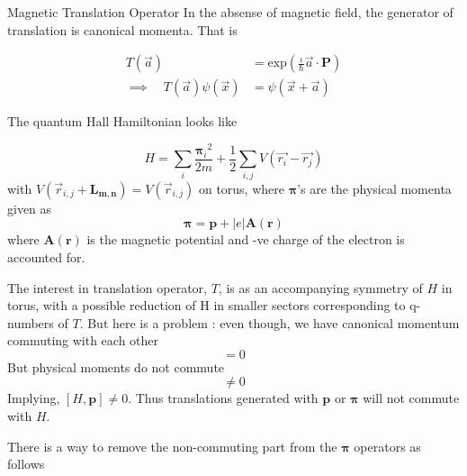\documentclass{beamer}
\newcommand{\bsym}{\boldsymbol}
\newcommand{\non}{\nonumber}
\begin{document}

	\begin{frame}[allowframebreaks]{Magnetic Translation Operator}
  		In the absense of magnetic field, the generator of translation is canonical momenta. That is

  		\begin{align}
    			T(\vec{a}) &= \text{exp}\left( \frac{\iota}{\hbar}{\vec{a}\cdot\bsym{P}}\right) \\
    			\implies \quad T(\vec{a})\psi(\vec{x}) &= \psi(\vec{x}+\vec{a}) \non
  		\end{align}
  
  		\framebreak %
  			  
  		The quantum Hall Hamiltonian looks like 

		\begin{equation}
			H = \sum_{i}\frac{{\bsym{\pi}_{i}}^{2}}{2m}  + \frac{1}{2}\sum_{i,j} V(\vec{r_i}-\vec{r_j})
		\end{equation}
		with $V(\vec{r}_{i,j} + \boldsymbol{L_{m,n}})=V(\vec{r}_{i,j})$ on torus, where $\bsym{\pi}$'s are the 
		physical momenta given as 
		\begin{equation*}
			\bsym{\pi} = \bsym{p} + |e|\bsym{A}(\bsym{r})
		\end{equation*}
		where $\bsym{A}(\bsym{r})$ is the magnetic potential and -ve charge of the electron is accounted for.
	
		\framebreak %
	
		The interest in translation operator, $T$, is as an accompanying symmetry of $H$ in torus, with a possible 
		reduction of H in smaller sectors corresponding to q-numbers of $T$. But here is a problem : even though, 
		we have canonical momentum commuting with each other
		\begin{equation*}
			[p_x,p_y] = 0
		\end{equation*}
		But physical moments do not commute
		\begin{equation*}
			[\pi_x,\pi_y] \neq 0
		\end{equation*}
		Implying, $[H,\bsym{p}]\neq 0$. Thus translations generated with $\bsym{p}$ or $\bsym{\pi}$ will not 
		commute with $H$.
		
		\framebreak %
		
		There is a way to remove the non-commuting part from the $\bsym{\pi}$ operators as follows
		

\end{frame}
\end{document}
